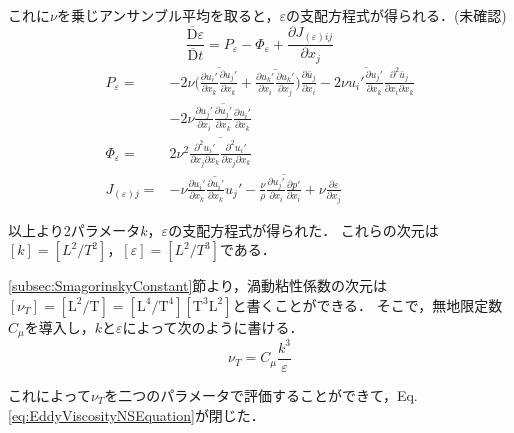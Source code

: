\documentclass[12pt,a4paper]{jsarticle}
\begin{document}
これに$\nu$を乗じアンサンブル平均を取ると，$\varepsilon$の支配方程式が得られる．(未確認)
\begin{equation}
  \frac{\overline{\mathrm{D}} \varepsilon}{\overline{\mathrm{D}} t} = P_\varepsilon -\Phi_\varepsilon +\frac{\partial J_{(\varepsilon)ij}}{\partial x_j}
  \label{eq:epsilon_equation} \tag{6.39}
\end{equation}
\begin{align}
  P_\varepsilon = &-2\nu \Big( \overline{\frac{\partial u_i'}{\partial x_k}\frac{\partial u_j'}{\partial x_k}} +\overline{\frac{\partial u_k'}{\partial x_i}\frac{\partial u_k'}{\partial x_j}} \Big) \frac{\partial \bar{u}_j}{\partial x_i} -2\nu \overline{u_i' \frac{\partial u_j'}{\partial x_k}} \frac{\partial^2 \bar{u}_j}{\partial x_i \partial x_k} \nonumber \\
    &-2\nu \overline{ \frac{\partial u_j'}{\partial x_i} \frac{\partial u_j'}{\partial x_k} \frac{\partial u_i'}{\partial x_k} } \tag{6.40} \\
  \Phi_\varepsilon = &2\nu^2 \overline{ \frac{\partial^2 u_i'}{\partial x_j \partial x_k} \frac{\partial^2 u_i'}{\partial x_j \partial x_k} } \tag{6.41} \\
  J_{(\varepsilon)j} = &-\nu \overline{ \frac{\partial u_i'}{\partial x_k}\frac{\partial u_i'}{\partial x_k}u_j' } -\frac{\nu}{\rho} \overline{ \frac{\partial u_j'}{\partial x_i}\frac{\partial p'}{\partial x_i} } +\nu \frac{\partial \varepsilon}{\partial x_j} \tag{6.42~-~6.44}
\end{align}

以上より2パラメータ$k$，$\varepsilon$の支配方程式が得られた．
これらの次元は$[k]=[L^2/T^2]$，$[\varepsilon]=[L^2/T^3]$である．

\ref{subsec:SmagorinskyConstant}節より，渦動粘性係数の次元は$[\nu_T] =[\mathrm{L}^2/\mathrm{T}] =[\mathrm{L^4}/\mathrm{T^4}][\mathrm{T}^3\mathrm{L}^2]$と書くことができる．
そこで，無地限定数$C_\mu$を導入し，$k$と$\varepsilon$によって次のように書ける．
\begin{equation}
  \nu_T = C_\mu \frac{k^3}{\varepsilon}
  \label{eq:k-epsilon_nuT} \tag{6.38}
\end{equation}

これによって$\nu_T$を二つのパラメータで評価することができて，Eq. \ref{eq:EddyViscosityNSEquation}が閉じた．\\
\end{document}
